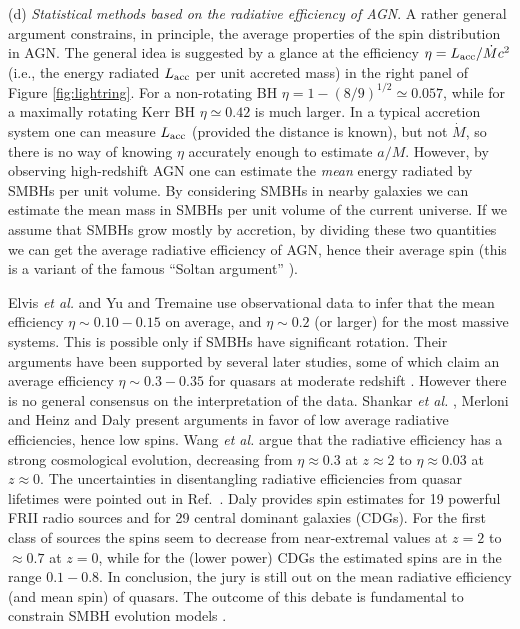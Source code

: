 \documentclass[]{iopart}
\begin{document}
\noindent
(d) {\it Statistical methods based on the radiative efficiency of AGN}.  A
rather general argument constrains, in principle, the average properties of
the spin distribution in AGN. The general idea is suggested by a glance at the
efficiency $\eta=L_{\rm acc}/\dot Mc^2$ (i.e., the energy radiated $L_{\rm
  acc}$ per unit accreted mass) in the right panel of Figure
\ref{fig:lightring}. For a non-rotating BH $\eta=1-(8/9)^{1/2}\simeq 0.057$,
while for a maximally rotating Kerr BH $\eta\simeq 0.42$ is much larger. In a
typical accretion system one can measure $L_{\rm acc}$ (provided the distance
is known), but not $\dot M$, so there is no way of knowing $\eta$ accurately
enough to estimate $a/M$. However, by observing high-redshift AGN one can
estimate the {\em mean} energy radiated by SMBHs per unit volume. By
considering SMBHs in nearby galaxies we can estimate the mean mass in SMBHs
per unit volume of the current universe. If we assume that SMBHs grow mostly
by accretion, by dividing these two quantities we can get the average
radiative efficiency of AGN, hence their average spin (this is a variant of
the famous ``Soltan argument'' \cite{Soltan:1982vf}).

Elvis {\it et al.} \cite{Elvis:2001bn} and Yu and Tremaine \cite{Yu:2002sq}
use observational data to infer that the mean efficiency $\eta\sim 0.10-0.15$
on average, and $\eta\sim 0.2$ (or larger) for the most massive systems. This
is possible only if SMBHs have significant rotation. Their arguments have been
supported by several later studies, some of which claim an average efficiency
$\eta\sim 0.3-0.35$ for quasars at moderate redshift
\cite{Wang:2006bz,Wang:2008ms,Cao:2008pd}. However there is no general
consensus on the interpretation of the data. Shankar {\it et al.}
\cite{Shankar:2007zg}, Merloni and Heinz \cite{Merloni:2008hx} and Daly
\cite{Daly:2008zk} present arguments in favor of low average radiative
efficiencies, hence low spins. Wang {\it et al.}  \cite{Wang:2009ws} argue
that the radiative efficiency has a strong cosmological evolution, decreasing
from $\eta\approx 0.3$ at $z\approx 2$ to $\eta\approx 0.03$ at $z\approx
0$. The uncertainties in disentangling radiative efficiencies from quasar
lifetimes were pointed out in Ref.~\cite{Rafiee:2008rz}. Daly
\cite{Daly:2009ih} provides spin estimates for 19 powerful FRII radio sources
and for 29 central dominant galaxies (CDGs). For the first class of sources
the spins seem to decrease from near-extremal values at $z=2$ to $\approx 0.7$
at $z=0$, while for the (lower power) CDGs the estimated spins are in the
range $0.1-0.8$. In conclusion, the jury is still out on the mean radiative
efficiency (and mean spin) of quasars. The outcome of this debate is
fundamental to constrain SMBH evolution models
\cite{Berti:2008af,Lagos:2009xr,Sijacki:2009mn}.
\end{document}
